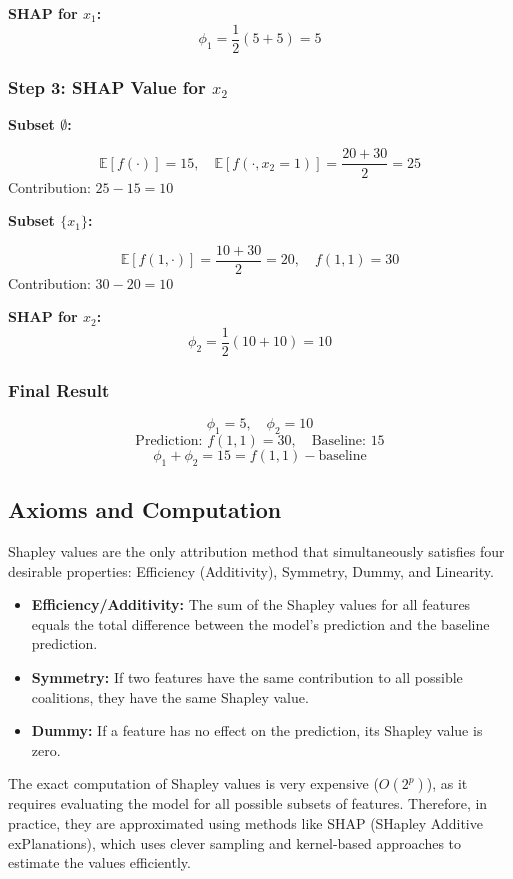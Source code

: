\documentclass{article}
\begin{document}
\begin{multicols}{2}
\medskip
\textbf{SHAP for \( x_1 \):}
\[
\phi_1 = \frac{1}{2}(5 + 5) = 5
\]

\subsubsection{Step 3: SHAP Value for \( x_2 \)}

\textbf{Subset \(\emptyset\):}

\[
\mathbb{E}[f(\cdot)] = 15, \quad
\mathbb{E}[f(\cdot, x_2=1)] = \frac{20 + 30}{2} = 25
\]
Contribution: \( 25 - 15 = 10 \)

\medskip
\textbf{Subset \(\{x_1\}\):}

\[
\mathbb{E}[f(1, \cdot)] = \frac{10 + 30}{2} = 20, \quad f(1,1) = 30
\]
Contribution: \( 30 - 20 = 10 \)

\medskip
\textbf{SHAP for \( x_2 \):}
\[
\phi_2 = \frac{1}{2}(10 + 10) = 10
\]

\subsubsection{Final Result}

\[
\phi_1 = 5, \quad \phi_2 = 10
\]
\[
\text{Prediction: } f(1,1) = 30, \quad \text{Baseline: } 15
\]
\[
\phi_1 + \phi_2 = 15 = f(1,1) - \text{baseline}
\]

\subsection{Axioms and Computation}
Shapley values are the only attribution method that simultaneously satisfies four desirable properties: Efficiency (Additivity), Symmetry, Dummy, and Linearity.
\begin{itemize}
    \item \textbf{Efficiency/Additivity:} The sum of the Shapley values for all features equals the total difference between the model's prediction and the baseline prediction.
    \item \textbf{Symmetry:} If two features have the same contribution to all possible coalitions, they have the same Shapley value.
    \item \textbf{Dummy:} If a feature has no effect on the prediction, its Shapley value is zero.
\end{itemize}
The exact computation of Shapley values is very expensive ($O(2^p)$), as it requires evaluating the model for all possible subsets of features. Therefore, in practice, they are approximated using methods like SHAP (SHapley Additive exPlanations), which uses clever sampling and kernel-based approaches to estimate the values efficiently.



\end{multicols}
\end{document}
